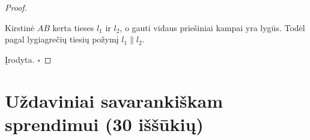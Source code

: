 \documentclass[11pt,a4paper]{scrartcl}
\begin{document}
\begin{proof}
\begin{center}
\end{center}

Kirstinė $AB$ kerta tieses $l_1$ ir $l_2$, o gauti vidaus priešiniai kampai yra lygūs. Todėl pagal lygiagrečių tiesių požymį $l_1\parallel l_2$.

Įrodyta. \hfill \(\square\)
\end{proof}

\vspace{0.5cm}

\newpage
\section{Uždaviniai savarankiškam sprendimui (30 iššūkių)}

\end{document}
